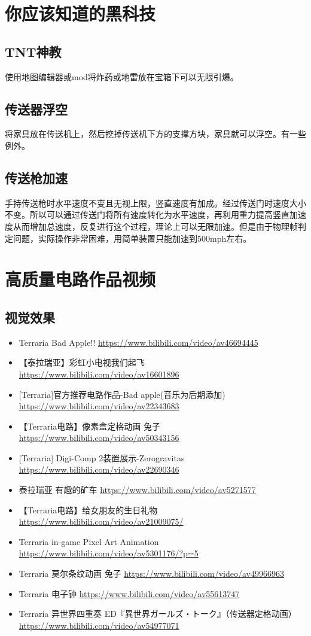 \chapter{你应该知道的黑科技}
\section{TNT神教}使用地图编辑器或mod将炸药或地雷放在宝箱下可以无限引爆。
\section{传送器浮空}将家具放在传送机上，然后挖掉传送机下方的支撑方块，家具就可以浮空。有一些例外。
\section{传送枪加速}手持传送枪时水平速度不变且无视上限，竖直速度有加成。经过传送门时速度大小不变。所以可以通过传送门将所有速度转化为水平速度，再利用重力提高竖直加速度从而增加总速度，反复进行这个过程，理论上可以无限加速。但是由于物理帧判定问题，实际操作非常困难，用简单装置只能加速到500mph左右。

\chapter{高质量电路作品视频}
\section{视觉效果}
\begin{itemize}
\item Terraria Bad Apple!! \url{https://www.bilibili.com/video/av46694445}
\item 【泰拉瑞亚】彩虹小电视我们起飞 \url{https://www.bilibili.com/video/av16601896}
\item {[}Terraria]官方推荐电路作品-Bad apple(音乐为后期添加) \url{https://www.bilibili.com/video/av22343683}
\item 【Terraria电路】像素盒定格动画 兔子 \url{https://www.bilibili.com/video/av50343156}
\item {[}Terraria] Digi-Comp 2装置展示-Zerogravitas \url{https://www.bilibili.com/video/av22690346}
\item 泰拉瑞亚 有趣的矿车 \url{https://www.bilibili.com/video/av5271577}
\item 【Terraria电路】给女朋友的生日礼物 \url{https://www.bilibili.com/video/av21009075/}
\item Terraria in-game Pixel Art Animation \url{https://www.bilibili.com/video/av5301176/?p=5}
\item Terraria 莫尔条纹动画 兔子 \url{https://www.bilibili.com/video/av49966963}
\item Terraria 电子钟 \url{https://www.bilibili.com/video/av55613747}
\item Terraria 异世界四重奏 ED『異世界ガールズ・トーク』（传送器定格动画） \url{https://www.bilibili.com/video/av54977071}
\end{itemize}

